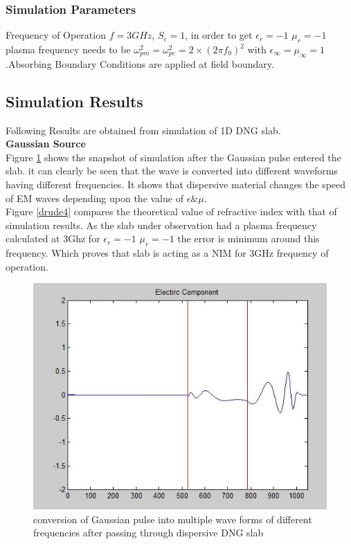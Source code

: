 \subsubsection{Simulation Parameters}
Frequency of Operation $f=3 GHz$, $S_c=1$, in order to get $\epsilon_r= -1$ $\mu_r= -1$ plasma frequency needs to be $\omega_{pm}^2 = \omega_{pe}^2 = 2 \times (2\pi f_0)^2$ with $\epsilon_\infty = \mu_\infty = 1$.Absorbing Boundary Conditions are applied at field boundary.
\subsection{Simulation Results}
Following Results are obtained from simulation of 1D DNG slab.\\
\textbf{Gaussian Source}\\
Figure \ref{drude3} shows the snapshot of simulation after the Gaussian pulse entered the slab. it can clearly be seen that the wave is converted into different waveforms having different frequencies. It shows that dispersive material changes the speed of EM waves depending upon the value of $\epsilon \& \mu$.\\
Figure \ref{drude4} compares the theoretical value of refractive index with that of simulation results. As the slab under observation had a plasma frequency calculated at 3Ghz for $\epsilon_r= -1$ $\mu_r= -1$ the error is minimum around this frequency. Which proves that slab is acting as a NIM for 3GHz frequency of operation.
\begin{figure}[H]
	\centering
		\includegraphics[width=5in]{Figures/drude3.jpg}
	\caption[Gaussian Pulse after Passing through DNG slab]{conversion of Gaussian pulse into multiple wave forms of different frequencies after passing through dispersive DNG slab}
	\label{drude3}
\end{figure}

